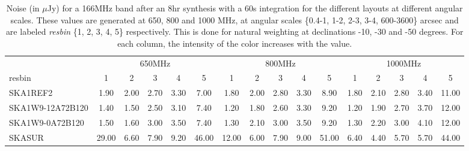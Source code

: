\begin{table}[!htp]
{{\begin{tabular}{|lccccc||ccccc||ccccc|}
 \tabularnewline \cline{2-16} \multicolumn{1}{c}{ } & \multicolumn{5}{|c}{650MHz}  & \multicolumn{5}{c}{800MHz}  & \multicolumn{5}{c|}{1000MHz} \tabularnewline \cline{1-16} 
 resbin  &1 & 2 & 3 & 4 & 5 & 1 & 2 & 3 & 4 & 5 & 1 & 2 & 3 & 4 & 5 \tabularnewline \hline
SKA1REF2 & 1.90 \cellcolor{blue!18.76} & 2.00 \cellcolor{red!22.12} & 2.70 \cellcolor{green!19.56} & 3.30 \cellcolor{orange!19.38} & 7.00 \cellcolor{purple!18.00} & 1.80 \cellcolor{blue!20.33} & 2.00 \cellcolor{red!20.00} & 2.80 \cellcolor{green!19.58} & 3.30 \cellcolor{orange!18.00} & 8.90 \cellcolor{purple!18.00} & 1.80 \cellcolor{blue!22.85} & 2.10 \cellcolor{red!21.36} & 2.80 \cellcolor{green!19.40} & 3.40 \cellcolor{orange!18.00} & 11.00 \cellcolor{purple!18.00}\\ \hline 
SKA1W9-12A72B120 & 1.40 \cellcolor{blue!18.00} & 1.50 \cellcolor{red!18.00} & 2.50 \cellcolor{green!18.00} & 3.10 \cellcolor{orange!18.00} & 7.40 \cellcolor{purple!18.43} & 1.20 \cellcolor{blue!18.00} & 1.80 \cellcolor{red!18.00} & 2.60 \cellcolor{green!18.00} & 3.30 \cellcolor{orange!18.00} & 9.20 \cellcolor{purple!18.30} & 1.20 \cellcolor{blue!18.00} & 1.90 \cellcolor{red!18.00} & 2.70 \cellcolor{green!18.00} & 3.70 \cellcolor{orange!23.48} & 12.00 \cellcolor{purple!19.27}\\ \hline 
SKA1W9-0A72B120 & 1.50 \cellcolor{blue!18.15} & 1.60 \cellcolor{red!18.82} & 3.00 \cellcolor{green!21.89} & 3.50 \cellcolor{orange!20.75} & 7.40 \cellcolor{purple!18.43} & 1.30 \cellcolor{blue!18.39} & 2.10 \cellcolor{red!21.00} & 3.00 \cellcolor{green!21.17} & 3.50 \cellcolor{orange!19.47} & 9.20 \cellcolor{purple!18.30} & 1.30 \cellcolor{blue!18.81} & 2.20 \cellcolor{red!23.04} & 3.00 \cellcolor{green!22.20} & 4.10 \cellcolor{orange!30.78} & 12.00 \cellcolor{purple!19.27}\\ \hline 
SKASUR & 29.00 \cellcolor{blue!60.00} & 6.60 \cellcolor{red!60.00} & 7.90 \cellcolor{green!60.00} & 9.20 \cellcolor{orange!60.00} & 46.00 \cellcolor{purple!60.00} & 12.00 \cellcolor{blue!60.00} & 6.00 \cellcolor{red!60.00} & 7.90 \cellcolor{green!60.00} & 9.00 \cellcolor{orange!60.00} & 51.00 \cellcolor{purple!60.00} & 6.40 \cellcolor{blue!60.00} & 4.40 \cellcolor{red!60.00} & 5.70 \cellcolor{green!60.00} & 5.70 \cellcolor{orange!60.00} & 44.00 \cellcolor{purple!60.00}\tabularnewline \hline 
\end{tabular}}\hfil 

\caption{Noise (in $\mu$Jy) for a 166MHz band after an 8hr synthesis with a 60s integration for the different layouts at different angular scales. These values are generated at 650, 800 and 1000 MHz, at angular scales \{0.4-1, 1-2, 2-3, 3-4, 600-3600\} arcsec and are labeled {\it resbin} \{1, 2, 3, 4, 5\} respectively. This is done for natural weighting at declinations -10, -30 and -50 degrees. For each column, the intensity of the color increases with the value.}\label{tab:noise166-band1}}
 \end{table}